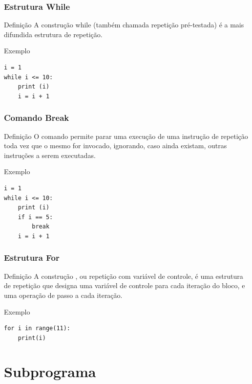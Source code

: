 \documentclass{beamer}
\begin{document}
\begin{frame}[fragile]
\frametitle{Estrutura While}

\begin{block}{Definição}
A construção while (também chamada repetição pré-testada) é a mais difundida estrutura de repetição.
\end{block}\vfill

\begin{exampleblock}{Exemplo}
\begin{lstlisting}
i = 1
while i <= 10:
    print (i)
    i = i + 1
\end{lstlisting}
\end{exampleblock}
\end{frame}

\begin{frame}[fragile]
\frametitle{Comando Break}

\begin{block}{Definição}
O comando  permite parar uma execução de uma instrução de repetição toda vez que o mesmo for invocado, ignorando, caso ainda existam, outras instruções a serem executadas.
\end{block}\vfill

\begin{exampleblock}{Exemplo}
	\begin{lstlisting}
i = 1
while i <= 10:
    print (i)
    if i == 5: 
        break
    i = i + 1
	\end{lstlisting}
\end{exampleblock}
\end{frame}

\begin{frame}[fragile]
\frametitle{Estrutura For}

\begin{block}{Definição}
A construção , ou repetição com variável de controle, é uma estrutura de repetição que designa uma variável de controle para cada iteração do bloco, e uma operação de passo a cada iteração.
\end{block}\vfill

\begin{exampleblock}{Exemplo}
	\begin{lstlisting}
for i in range(11):
    print(i)
	\end{lstlisting}
\end{exampleblock}
\end{frame}

\section{Subprograma}
\end{document}
